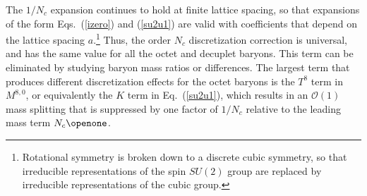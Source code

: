 \documentclass[twocolumn,nofootinbib,prd,aps,superscriptaddress,tightenlines]{revtex4}
\begin{document}
The $1/N_c$ expansion continues to hold at finite lattice spacing, so that expansions of the form Eqs.~(\ref{izero})
and (\ref{su2u1}) are valid with coefficients that depend on the lattice spacing $a$.\footnote{Rotational symmetry is broken down to a discrete cubic symmetry, so that irreducible representations of the spin $SU(2)$ group are replaced by irreducible representations of the cubic group.} Thus, the order $N_c$ discretization correction is universal, and has the same value for all the octet and decuplet baryons. This term can be eliminated by studying baryon mass ratios or differences. The largest term that produces different discretization effects for the octet baryons is the $T^8$ term in $M^{8,0}$, or equivalently the $K$ term in Eq.~(\ref{su2u1}), which results in an $\mathcal{O}(1)$ mass splitting that is suppressed by one factor of $1/N_c$ relative to the leading mass term $N_c\openone$.
\end{document}

